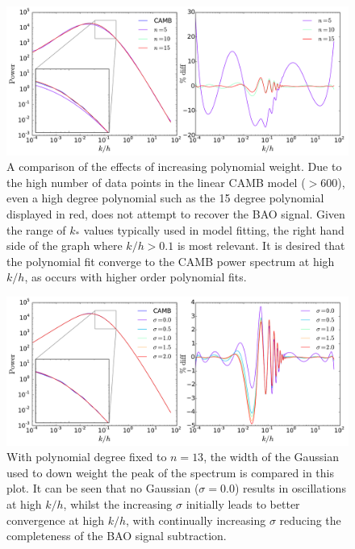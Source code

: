 \documentclass[titlesmallcaps, examinerscopy, copyrightpage]{uqthesis}
\begin{document}
\begin{appendices}
\begin{figure}[h]
  \begin{center}
    \includegraphics[width=\textwidth]{images/ApolyDegree.pdf}
  	\caption{A comparison of the effects of increasing polynomial weight. Due to the high number of data points in the linear CAMB model ($>600$), even a high degree polynomial such as the 15 degree polynomial displayed in red, does not attempt to recover the BAO signal. Given the range of $k_*$ values typically used in model fitting, the right hand side of the graph where $k/h > 0.1$ is most relevant. It is desired that the polynomial fit converge to the CAMB power spectrum at high $k/h$, as occurs with higher order polynomial fits.}
  	\label{fig:ApolyDegree}
  \end{center}
\end{figure}

\begin{figure}[h]
  \begin{center}
    \includegraphics[width=\textwidth]{images/ApolySigma.pdf}
  	\caption{With polynomial degree fixed to $n = 13$, the width of the Gaussian used to down weight the peak of the spectrum is compared in this plot. It can be seen that no Gaussian ($\sigma= 0.0$) results in oscillations at high $k/h$, whilst the increasing $\sigma$ initially leads to better convergence at high $k/h$, with continually increasing $\sigma$ reducing the completeness of the BAO signal subtraction.}
  	\label{fig:ApolySigma}
  \end{center}
\end{figure}


\end{appendices}
\end{document}
